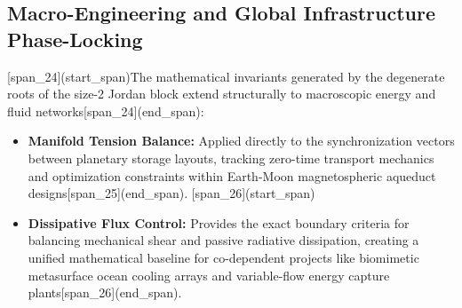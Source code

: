 \documentclass[12pt,letterpaper]{article}
\theoremstyle{definition}
\begin{document}
\subsection{Macro-Engineering and Global Infrastructure Phase-Locking}
[span_24](start_span)The mathematical invariants generated by the degenerate roots of the size-2 Jordan block extend structurally to macroscopic energy and fluid networks[span_24](end_span):
\begin{itemize}
    [span_25](start_span)\item \textbf{Manifold Tension Balance:} Applied directly to the synchronization vectors between planetary storage layouts, tracking zero-time transport mechanics and optimization constraints within Earth-Moon magnetospheric aqueduct designs[span_25](end_span).
    [span_26](start_span)\item \textbf{Dissipative Flux Control:} Provides the exact boundary criteria for balancing mechanical shear and passive radiative dissipation, creating a unified mathematical baseline for co-dependent projects like biomimetic metasurface ocean cooling arrays and variable-flow energy capture plants[span_26](end_span).
\end{itemize}
\end{document}
